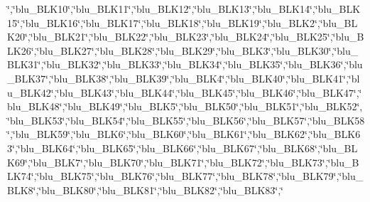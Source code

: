 {\char`\"{},\char`\"{}blu\-\_\-\-B\-L\-K10\char`\"{},\char`\"{}blu\-\_\-\-B\-L\-K11\char`\"{},\char`\"{}blu\-\_\-\-B\-L\-K12\char`\"{},\char`\"{}blu\-\_\-\-B\-L\-K13\char`\"{},\char`\"{}blu\-\_\-\-B\-L\-K14\char`\"{},\char`\"{}blu\-\_\-\-B\-L\-K15\char`\"{},\char`\"{}blu\-\_\-\-B\-L\-K16\char`\"{},\char`\"{}blu\-\_\-\-B\-L\-K17\char`\"{},\char`\"{}blu\-\_\-\-B\-L\-K18\char`\"{},\char`\"{}blu\-\_\-\-B\-L\-K19\char`\"{},\char`\"{}blu\-\_\-\-B\-L\-K2\char`\"{},\char`\"{}blu\-\_\-\-B\-L\-K20\char`\"{},\char`\"{}blu\-\_\-\-B\-L\-K21\char`\"{},\char`\"{}blu\-\_\-\-B\-L\-K22\char`\"{},\char`\"{}blu\-\_\-\-B\-L\-K23\char`\"{},\char`\"{}blu\-\_\-\-B\-L\-K24\char`\"{},\char`\"{}blu\-\_\-\-B\-L\-K25\char`\"{},\char`\"{}blu\-\_\-\-B\-L\-K26\char`\"{},\char`\"{}blu\-\_\-\-B\-L\-K27\char`\"{},\char`\"{}blu\-\_\-\-B\-L\-K28\char`\"{},\char`\"{}blu\-\_\-\-B\-L\-K29\char`\"{},\char`\"{}blu\-\_\-\-B\-L\-K3\char`\"{},\char`\"{}blu\-\_\-\-B\-L\-K30\char`\"{},\char`\"{}blu\-\_\-\-B\-L\-K31\char`\"{},\char`\"{}blu\-\_\-\-B\-L\-K32\char`\"{},\char`\"{}blu\-\_\-\-B\-L\-K33\char`\"{},\char`\"{}blu\-\_\-\-B\-L\-K34\char`\"{},\char`\"{}blu\-\_\-\-B\-L\-K35\char`\"{},\char`\"{}blu\-\_\-\-B\-L\-K36\char`\"{},\char`\"{}blu\-\_\-\-B\-L\-K37\char`\"{},\char`\"{}blu\-\_\-\-B\-L\-K38\char`\"{},\char`\"{}blu\-\_\-\-B\-L\-K39\char`\"{},\char`\"{}blu\-\_\-\-B\-L\-K4\char`\"{},\char`\"{}blu\-\_\-\-B\-L\-K40\char`\"{},\char`\"{}blu\-\_\-\-B\-L\-K41\char`\"{},\char`\"{}blu\-\_\-\-B\-L\-K42\char`\"{},\char`\"{}blu\-\_\-\-B\-L\-K43\char`\"{},\char`\"{}blu\-\_\-\-B\-L\-K44\char`\"{},\char`\"{}blu\-\_\-\-B\-L\-K45\char`\"{},\char`\"{}blu\-\_\-\-B\-L\-K46\char`\"{},\char`\"{}blu\-\_\-\-B\-L\-K47\char`\"{},\char`\"{}blu\-\_\-\-B\-L\-K48\char`\"{},\char`\"{}blu\-\_\-\-B\-L\-K49\char`\"{},\char`\"{}blu\-\_\-\-B\-L\-K5\char`\"{},\char`\"{}blu\-\_\-\-B\-L\-K50\char`\"{},\char`\"{}blu\-\_\-\-B\-L\-K51\char`\"{},\char`\"{}blu\-\_\-\-B\-L\-K52\char`\"{},\char`\"{}blu\-\_\-\-B\-L\-K53\char`\"{},\char`\"{}blu\-\_\-\-B\-L\-K54\char`\"{},\char`\"{}blu\-\_\-\-B\-L\-K55\char`\"{},\char`\"{}blu\-\_\-\-B\-L\-K56\char`\"{},\char`\"{}blu\-\_\-\-B\-L\-K57\char`\"{},\char`\"{}blu\-\_\-\-B\-L\-K58\char`\"{},\char`\"{}blu\-\_\-\-B\-L\-K59\char`\"{},\char`\"{}blu\-\_\-\-B\-L\-K6\char`\"{},\char`\"{}blu\-\_\-\-B\-L\-K60\char`\"{},\char`\"{}blu\-\_\-\-B\-L\-K61\char`\"{},\char`\"{}blu\-\_\-\-B\-L\-K62\char`\"{},\char`\"{}blu\-\_\-\-B\-L\-K63\char`\"{},\char`\"{}blu\-\_\-\-B\-L\-K64\char`\"{},\char`\"{}blu\-\_\-\-B\-L\-K65\char`\"{},\char`\"{}blu\-\_\-\-B\-L\-K66\char`\"{},\char`\"{}blu\-\_\-\-B\-L\-K67\char`\"{},\char`\"{}blu\-\_\-\-B\-L\-K68\char`\"{},\char`\"{}blu\-\_\-\-B\-L\-K69\char`\"{},\char`\"{}blu\-\_\-\-B\-L\-K7\char`\"{},\char`\"{}blu\-\_\-\-B\-L\-K70\char`\"{},\char`\"{}blu\-\_\-\-B\-L\-K71\char`\"{},\char`\"{}blu\-\_\-\-B\-L\-K72\char`\"{},\char`\"{}blu\-\_\-\-B\-L\-K73\char`\"{},\char`\"{}blu\-\_\-\-B\-L\-K74\char`\"{},\char`\"{}blu\-\_\-\-B\-L\-K75\char`\"{},\char`\"{}blu\-\_\-\-B\-L\-K76\char`\"{},\char`\"{}blu\-\_\-\-B\-L\-K77\char`\"{},\char`\"{}blu\-\_\-\-B\-L\-K78\char`\"{},\char`\"{}blu\-\_\-\-B\-L\-K79\char`\"{},\char`\"{}blu\-\_\-\-B\-L\-K8\char`\"{},\char`\"{}blu\-\_\-\-B\-L\-K80\char`\"{},\char`\"{}blu\-\_\-\-B\-L\-K81\char`\"{},\char`\"{}blu\-\_\-\-B\-L\-K82\char`\"{},\char`\"{}blu\-\_\-\-B\-L\-K83\char`\"{},\char`\"{}}
